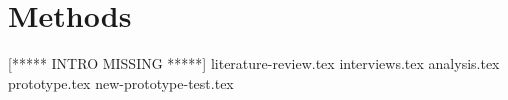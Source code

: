 
\chapter{Methods}
[***** INTRO MISSING *****]
{literature-review.tex}
{interviews.tex}
{analysis.tex}
{prototype.tex}
{new-prototype-test.tex}
